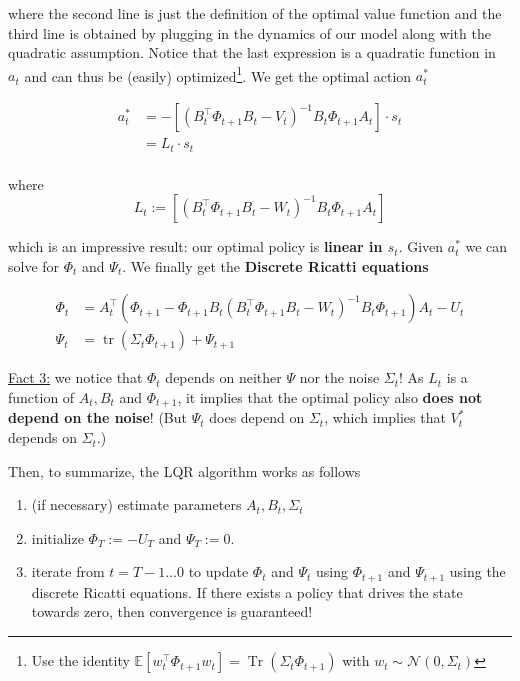 \documentclass{article}
\begin{document}
\begin{enumerate}
	 where the second line is just the definition of the optimal value function and the third line is obtained by plugging in the dynamics of our model along with the quadratic assumption. Notice that the last expression is a quadratic function in $ a_t $ and can thus be (easily) optimized\footnote{Use the identity $ \mathbb{E}\left[ w_t^\top \Phi_{t+1} w_t \right] = \operatorname{Tr}(\Sigma_t \Phi_{t+1}) $ with $ w_t \sim \mathcal{N}\left(0, \Sigma_t \right) $}. We get the optimal action $ a_t^* $
	 
	 \begin{align*}
	 a_t^* &= - \left[ (B_t^\top \Phi_{t+1} B_t - V_t)^{-1} B_t \Phi_{t+1} A_t \right] \cdot s_t\\
	  &= L_t \cdot s_t \\
	 \end{align*}
	 
	 where $$ L_t := \left[ (B_t^\top \Phi_{t+1} B_t - W_t)^{-1} B_t \Phi_{t+1} A_t \right] $$
	 
	  which is an impressive result: our optimal policy is \textbf{linear in $ s_t $}. Given $ a_t^* $ we can solve for $ \Phi_t $ and $ \Psi_t $. We finally get the \textbf{Discrete Ricatti equations}
	 
	 \begin{align*}
	 	\Phi_t &= A_t^\top \left( \Phi_{t+1} - \Phi_{t+1} B_t \left( B_t^\top \Phi_{t+1} B_t - W_t\right)^{-1} B_t \Phi_{t+1}\right) A_t - U_t \\
	 	\Psi_t &= \operatorname{tr}\left(\Sigma_t \Phi_{t+1}\right) + \Psi_{t+1}
	 \end{align*}
	 
	 \underline{Fact 3:} we notice that $ \Phi_t $ depends on neither $ \Psi $ nor the noise $ \Sigma_t $!  As $ L_t $ is a function of $ A_t, B_t $ and $ \Phi_{t+1} $, it implies that the optimal policy also \textbf{does not depend on the noise}! (But $ \Psi_t $ does depend on $ \Sigma_t $, which implies that $ V_t^* $ depends on $ \Sigma_t $.)
	 
\end{enumerate}

Then, to summarize, the LQR algorithm works as follows

\begin{enumerate}
	\item (if necessary) estimate parameters $ A_t, B_t, \Sigma_t $
	\item initialize $ \Phi_T := - U_T $ and $ \Psi_T := 0 $.
	\item iterate from $ t=T-1 \dots 0 $ to update $ \Phi_t $ and $ \Psi_t $ using $ \Phi_{t+1} $ and $ \Psi_{t+1} $ using the discrete Ricatti equations. If there exists a policy that drives the state towards zero, then convergence is guaranteed!
\end{enumerate}
\end{document}
